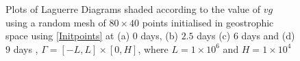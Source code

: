 \begin{figure}[ht]
	\centering
	\\
	\\
	\caption{Plots of Laguerre Diagrams shaded according to the value of $vg$ using a random mesh of $80 \times 40$ points initialised in geostrophic space using \ref{Initpoints} at (a) $0$ days, (b) $2.5$ days (c) $6$ days and (d) $9$ days , $\Gamma = [-L,L]\times[0,H]$, where $L = 1\times10^6$ and $H = 1\times10^4$}
	\label{fig: vg ldiag}
\end{figure}
